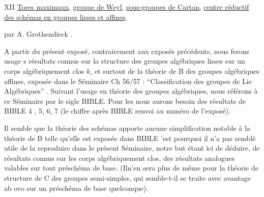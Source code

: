 
XII \quad \uline{Tores maximaux}, \uline{groupe de Weyl}, \uline{sous-groupes de Cartan}, \uline{centre réductif des schémas en groupes lisses et affines}.

par A. Grothendieck .

A partir du présent exposé, contrairement aux exposés précédents, nous ferons usage s résultats connus sur la structure des groupes algébriques lisses sur un corps algébriquement clos $k$, et surtout de la théorie de B des groupes algébriques affines, exposée dans le Séminaire Ch 56/57 :  ``Classification des groupes de Lie Algébriques'' . Suivant l'usage en théorie des groupes algébriques, nous référons à ce Séminaire par le sigle BIBLE. Pour les   nous aurons besoin  des résultats de BIBLE 4 , 5, 6, 7 (le chiffre après BIBLE renvoi au numéro de l'exposé).

Il  semble   que la théorie des schémas apporte aucune simplification notable à la théorie  de B telle qu'elle est exposée dans BIBLE\handwritten{,} 'est pourquoi il n'a pas semblé utile de la reproduire  dans le présent Séminaire, notre but étant ici de déduire, de résultats connus sur les corps algébriquement clos, des résultats analogues valables sur tout préschéma de base. (Il\unsure{\,\textperiodcentered\,| }n'en sera plus de même pour la théorie de structure de C\deleted{\unsure{,}} des groupes semi-simples, qui\handwritten{,} semble-t-il\handwritten{,} se traite avec avantage ab ovo sur un préschéma de base quelconque).


